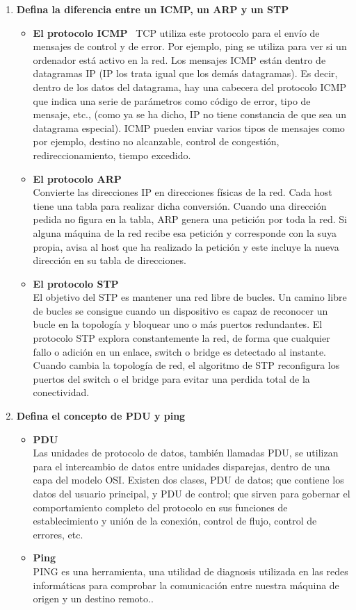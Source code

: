 \documentclass[a4paper,12pt]{article}
\begin{document}
\begin{enumerate}
 \item \textbf{Defina la diferencia entre un ICMP, un ARP y un STP} \par
 \begin{itemize}
  \item \textbf{El protocolo ICMP} \
  TCP utiliza este protocolo para el envío de mensajes de control y de error. Por ejemplo, ping se utiliza para ver si un ordenador está activo en la red.
  Los mensajes ICMP están dentro de datagramas IP (IP los trata igual que los demás datagramas). Es decir, dentro de los datos del datagrama, hay una cabecera del protocolo ICMP que indica una serie de parámetros como código de error, tipo de mensaje, etc., (como ya se ha dicho, IP no tiene constancia de que sea un datagrama especial).
  ICMP pueden enviar varios tipos de mensajes como por ejemplo, destino no alcanzable, control de congestión, redireccionamiento, tiempo excedido.
  \item \textbf{El protocolo ARP} \\
  Convierte las direcciones IP en direcciones físicas de la red. Cada host tiene una tabla para realizar dicha conversión. Cuando una dirección pedida no figura en la tabla, ARP genera una petición por toda la red. Si alguna máquina de la red recibe esa petición y corresponde con la suya propia, avisa al host que ha realizado la petición y este incluye la nueva dirección en su tabla de direcciones.
  \item \textbf{El protocolo STP} \\
  El objetivo del STP es mantener una red libre de bucles. Un camino libre de bucles se consigue cuando un dispositivo es capaz de reconocer un bucle en la topología y bloquear uno o más puertos redundantes.
  El protocolo STP explora constantemente la red, de forma que cualquier fallo o adición en un enlace, switch o bridge es detectado al instante. Cuando cambia la topología de red, el algoritmo de STP reconfigura los puertos del switch o el bridge para evitar una perdida total de la conectividad.
 \end{itemize}

 \item \textbf{Defina el concepto de PDU y ping}
 \begin{itemize}
  \item \textbf{PDU} \\
  Las unidades de protocolo de datos, también llamadas PDU, se utilizan para el intercambio de datos entre unidades disparejas, dentro de una capa del modelo OSI. Existen dos clases, PDU de datos; que contiene los datos del usuario principal,
  y PDU de control; que sirven para gobernar el comportamiento completo del protocolo en sus funciones de establecimiento y unión de la conexión, control de flujo, control de errores, etc.
  \item \textbf{Ping} \\
  PING es una herramienta, una utilidad de diagnosis utilizada en las redes informáticas para comprobar la comunicación entre nuestra máquina de origen y un destino remoto..
 \end{itemize}


\end{enumerate}
\end{document}
